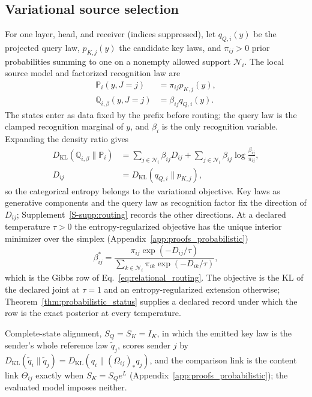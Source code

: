 \documentclass[twoside,11pt]{article}
\begin{document}
\subsection{Variational source selection}
\label{sec:mixture_derivation}
For one layer, head, and receiver (indices suppressed), let $q_{Q,i}(y)$ be the projected query law, $p_{K,j}(y)$ the candidate key laws, and $\pi_{ij}>0$ prior probabilities summing to one on a nonempty allowed support $\mathcal N_i$. The local source model and factorized recognition law are
\begin{align}
\mathbb P_i(y,J=j)&=\pi_{ij}p_{K,j}(y),\label{eq:mixture_joint}\\
\mathbb Q_{i,\beta}(y,J=j)&=\beta_{ij}q_{Q,i}(y).\label{eq:mixture_posterior}
\end{align}
The states enter as data fixed by the prefix before routing; the query law is the clamped recognition marginal of $y$, and $\beta_i$ is the only recognition variable. Expanding the density ratio gives
\begin{align}
D_{\mathrm{KL}}(\mathbb Q_{i,\beta}\|\mathbb P_i)
&=\sum_{j\in\mathcal N_i}\beta_{ij}D_{ij}
+\sum_{j\in\mathcal N_i}\beta_{ij}\log\frac{\beta_{ij}}{\pi_{ij}},
\label{eq:mixture_free_energy}\\
D_{ij}&=D_{\mathrm{KL}}(q_{Q,i}\|p_{K,j}),
\label{eq:mixture_energy_entropy}
\end{align}
so the categorical entropy belongs to the variational objective. Key laws as generative components and the query law as recognition factor fix the direction of $D_{ij}$; Supplement~\ref{S-supp:routing} records the other directions. At a declared temperature $\tau>0$ the entropy-regularized objective has the unique interior minimizer over the simplex (Appendix~\ref{app:proofs_probabilistic})
\begin{equation}
\beta_{ij}^*=\frac{\pi_{ij}\exp(-D_{ij}/\tau)}
{\sum_{k\in\mathcal N_i}\pi_{ik}\exp(-D_{ik}/\tau)},
\label{eq:mixture_softmax_general}
\end{equation}
which is the Gibbs row of Eq.~\eqref{eq:relational_routing}. The objective is the KL of the declared joint at $\tau=1$ and an entropy-regularized extension otherwise; Theorem~\ref{thm:probabilistic_status} supplies a declared record under which the row is the exact posterior at every temperature.

Complete-state alignment, $S_Q=S_K=I_K$, in which the emitted key law is the sender's whole reference law $\widetilde q_j$, scores sender $j$ by $D_{\mathrm{KL}}(\widetilde q_i\|\widetilde q_j)=D_{\mathrm{KL}}(q_i\|(\Omega_{ij})_*q_j)$, and the comparison link is the content link $\Theta_{ij}$ exactly when $S_K=S_Qe^{L}$ (Appendix~\ref{app:proofs_probabilistic}); the evaluated model imposes neither.
\end{document}
